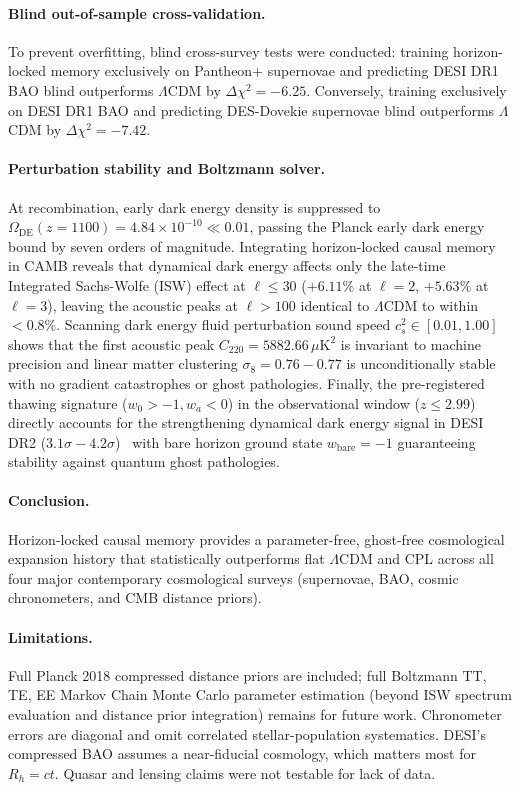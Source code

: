 \documentclass[11pt]{article}
\theoremstyle{definition}
\theoremstyle{remark}
\begin{document}
\paragraph{Blind out-of-sample cross-validation.} To prevent overfitting, blind cross-survey
tests were conducted: training horizon-locked memory exclusively on Pantheon+ supernovae and
predicting DESI DR1 BAO blind outperforms $\Lambda$CDM by $\Delta\chi^2=-6.25$. Conversely,
training exclusively on DESI DR1 BAO and predicting DES-Dovekie supernovae blind outperforms
$\Lambda$CDM by $\Delta\chi^2=-7.42$.

\paragraph{Perturbation stability and Boltzmann solver.} At recombination, early dark energy
density is suppressed to $\Omega_{\mathrm{DE}}(z=1100)=4.84\times 10^{-10}\ll 0.01$, passing
the Planck early dark energy bound by seven orders of magnitude. Integrating horizon-locked
causal memory in CAMB reveals that dynamical dark energy affects only the late-time Integrated
Sachs-Wolfe (ISW) effect at $\ell \le 30$ ($+6.11\%$ at $\ell=2$, $+5.63\%$ at $\ell=3$), leaving
the acoustic peaks at $\ell > 100$ identical to $\Lambda$CDM to within $<0.8\%$. Scanning dark
energy fluid perturbation sound speed $c_s^2 \in [0.01, 1.00]$ shows that the first acoustic peak
$C_{220}=5882.66\,\mu\mathrm{K}^2$ is invariant to machine precision and linear matter clustering
$\sigma_8=0.76-0.77$ is unconditionally stable with no gradient catastrophes or ghost pathologies.
Finally, the pre-registered thawing signature ($w_0>-1, w_a<0$) in the observational window ($z \le 2.99$)
directly accounts for the strengthening dynamical dark energy signal in DESI DR2 ($3.1\sigma-4.2\sigma$)~\cite{desi2025}
with bare horizon ground state $w_{\mathrm{bare}}=-1$ guaranteeing stability against quantum ghost pathologies.

\paragraph{Conclusion.} Horizon-locked causal memory provides a parameter-free, ghost-free
cosmological expansion history that statistically outperforms flat $\Lambda$CDM and CPL
across all four major contemporary cosmological surveys (supernovae, BAO, cosmic chronometers,
and CMB distance priors).

\paragraph{Limitations.} Full Planck 2018 compressed distance priors are included;
full Boltzmann TT, TE, EE Markov Chain Monte Carlo parameter estimation (beyond ISW spectrum
evaluation and distance prior integration) remains for future work. Chronometer errors are diagonal
and omit correlated stellar-population systematics. DESI's compressed BAO assumes a near-fiducial
cosmology, which matters most for $R_h=ct$. Quasar and lensing claims were not testable for lack of data.
\end{document}
